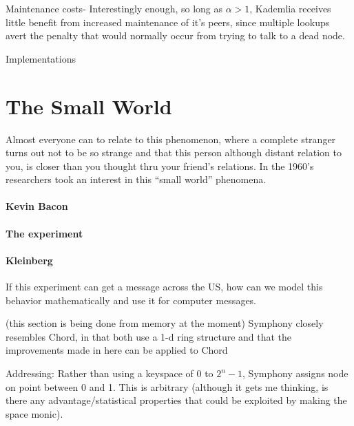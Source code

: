 \documentclass[10pt,letterpaper]{report}
\begin{document}
Maintenance costs-  Interestingly enough, so long as $\alpha >1$, Kademlia receives little benefit from increased maintenance of it's peers, since multiple lookups avert the penalty that would normally occur from trying to talk to a dead node.


Implementations



\section{The Small World}

Almost everyone can to relate to this phenomenon, where a complete stranger turns out not to be so strange and that this person although distant relation to you, is closer than you thought thru your friend's relations.  In the 1960's researchers took an interest in this ``small world'' phenomena.	


\paragraph{Kevin Bacon}
\paragraph{The experiment}
\paragraph{Kleinberg}
If this experiment can get a message across the US, how can we model this behavior mathematically and use it for computer messages.


(this section is being done from memory at the moment)
Symphony closely resembles Chord, in that both use a 1-d ring structure and that the improvements made in here can be applied to Chord

Addressing:  Rather than using a keyspace of 0 to $2^n - 1$, Symphony assigns node on point between 0 and 1.  This is arbitrary (although it gets me thinking, is there any advantage/statistical properties   that could be exploited by making the space monic).
\end{document}
